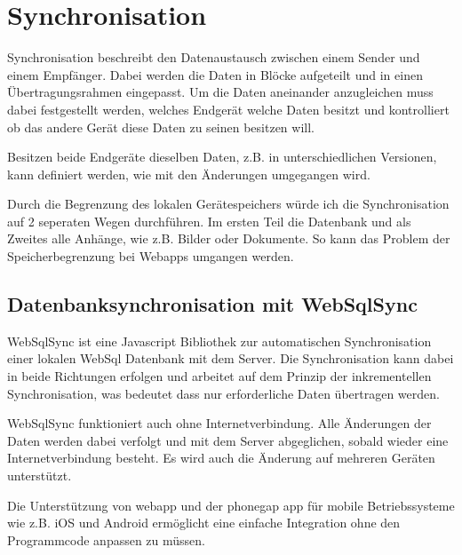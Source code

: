 %
\chapter{Synchronisation}
\label{sec:Synchronisation}


Synchronisation beschreibt den Datenaustausch zwischen einem Sender und einem Empfänger. Dabei werden die Daten in Blöcke aufgeteilt und in einen Übertragungsrahmen eingepasst. Um die Daten aneinander anzugleichen muss dabei festgestellt werden, welches Endgerät welche Daten besitzt und kontrolliert ob das andere Gerät diese Daten zu seinen besitzen will.

Besitzen beide Endgeräte dieselben Daten, z.B. in unterschiedlichen Versionen, kann definiert werden, wie mit den Änderungen umgegangen wird.\cite[]{WEB:SYNCML:2014}

Durch die Begrenzung des lokalen Gerätespeichers würde ich die Synchronisation auf 2 seperaten Wegen durchführen. Im ersten Teil die Datenbank und als Zweites alle Anhänge, wie z.B. Bilder oder Dokumente. So kann das Problem der Speicherbegrenzung bei Webapps umgangen werden.

\section{Datenbanksynchronisation mit WebSqlSync}
\label{sec:dbsync}

WebSqlSync ist eine Javascript Bibliothek zur automatischen Synchronisation einer lokalen WebSql Datenbank mit dem Server. Die Synchronisation kann dabei in beide Richtungen erfolgen und arbeitet auf dem Prinzip der inkrementellen Synchronisation, was bedeutet dass nur erforderliche Daten übertragen werden.

WebSqlSync funktioniert auch ohne Internetverbindung. Alle Änderungen der Daten werden dabei verfolgt und mit dem Server abgeglichen, sobald wieder eine Internetverbindung besteht. Es wird auch die Änderung auf mehreren Geräten unterstützt.

Die Unterstützung von webapp und der phonegap app für mobile Betriebssysteme wie z.B. iOS und Android ermöglicht eine einfache Integration ohne den Programmcode anpassen zu müssen.\cite[]{WEB:WEBSQLSYNC:2014}

